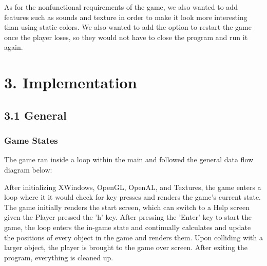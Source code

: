 \documentclass[12pt]{report}
\begin{document}
As for the nonfunctional requirements of the game, we also wanted to add features such as sounds and texture in order to make it look more interesting than using static colors. We also wanted to add the option to restart the game once the player loses, so they would not have to close the program and run it again.

\newpage
\section*{3. Implementation}

\subsection*{3.1 General}

\subsubsection*{Game States}
The game ran inside a loop within the main and followed the general data flow diagram below: \bigskip


\medskip After initializing XWindows, OpenGL, OpenAL, and Textures, the game enters a loop where it it would check for key presses and renders the game's current state. The game initially renders the start screen, which can switch to a Help screen given the Player pressed the 'h' key. After pressing the 'Enter' key to start the game, the loop enters the in-game state and continually calculates and update the positions of every object in the game and renders them. Upon colliding with a larger object, the player is brought to the game over screen. After exiting the program, everything is cleaned up.
\end{document}
